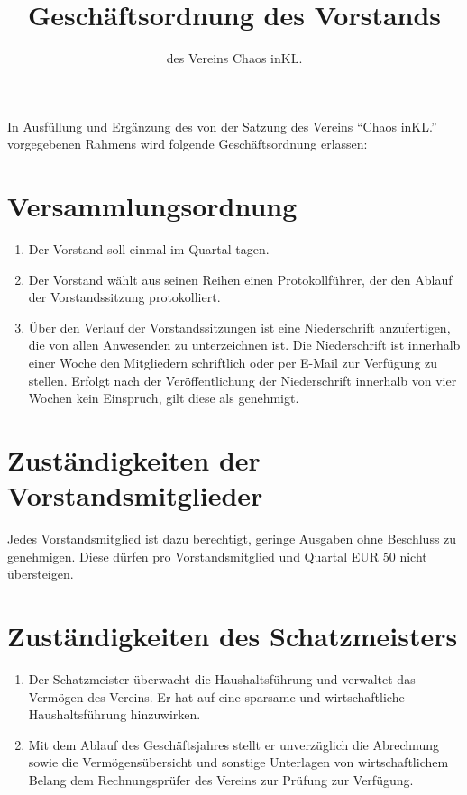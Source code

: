 \documentclass[a4paper, 12pt]{scrartcl}
\begin{document}
\title{Geschäftsordnung des Vorstands}
\subtitle{des Vereins Chaos inKL.}
\author{}
\date{}

\maketitle
In Ausfüllung und Ergänzung des von der Satzung des Vereins "`Chaos
inKL."' vorgegebenen Rahmens wird folgende Geschäftsordnung erlassen:

\section{Versammlungsordnung}
\begin{enumerate}
	\item Der Vorstand soll einmal im Quartal tagen.
\item Der Vorstand wählt aus seinen Reihen einen Protokollführer, der den
Ablauf der Vorstandssitzung protokolliert.
	\item Über den Verlauf der Vorstandssitzungen ist eine Niederschrift
anzufertigen, die von allen Anwesenden zu unterzeichnen ist. Die
Niederschrift ist innerhalb einer Woche den Mitgliedern schriftlich oder
per E-Mail zur Verfügung zu stellen. Erfolgt nach der Veröffentlichung der
Niederschrift innerhalb von vier Wochen kein Einspruch, gilt diese als
genehmigt.
\end{enumerate}

\section{Zuständigkeiten der Vorstandsmitglieder}
Jedes Vorstandsmitglied ist dazu berechtigt, geringe Ausgaben ohne Beschluss zu genehmigen. Diese dürfen pro Vorstandsmitglied und Quartal EUR 50 nicht übersteigen.

\section{Zuständigkeiten des Schatzmeisters}
\begin{enumerate}
	\item Der Schatzmeister überwacht die Haushaltsführung und verwaltet das
Vermögen des Vereins. Er hat auf eine sparsame und wirtschaftliche
Haushaltsführung hinzuwirken.
	\item Mit dem Ablauf des Geschäftsjahres stellt er unverzüglich die Abrechnung
sowie die Vermögensübersicht und sonstige Unterlagen von
wirtschaftlichem Belang dem Rechnungsprüfer des Vereins zur Prüfung zur
Verfügung.
\end{enumerate}
\end{document}
